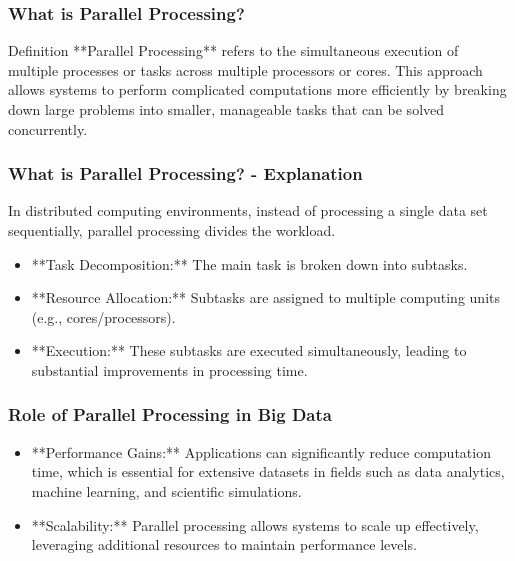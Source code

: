 \documentclass[aspectratio=169]{beamer}
\begin{document}
\begin{frame}[fragile]
    \frametitle{What is Parallel Processing?}
    \begin{block}{Definition}
        **Parallel Processing** refers to the simultaneous execution of multiple processes or tasks across multiple processors or cores.
        This approach allows systems to perform complicated computations more efficiently by breaking down large problems into smaller, manageable tasks that can be solved concurrently.
    \end{block}
\end{frame}

\begin{frame}[fragile]
    \frametitle{What is Parallel Processing? - Explanation}
    In distributed computing environments, instead of processing a single data set sequentially, parallel processing divides the workload.
    \begin{itemize}
        \item **Task Decomposition:** The main task is broken down into subtasks.
        \item **Resource Allocation:** Subtasks are assigned to multiple computing units (e.g., cores/processors).
        \item **Execution:** These subtasks are executed simultaneously, leading to substantial improvements in processing time.
    \end{itemize}
\end{frame}

\begin{frame}[fragile]
    \frametitle{Role of Parallel Processing in Big Data}
    \begin{itemize}
        \item **Performance Gains:** Applications can significantly reduce computation time, which is essential for extensive datasets in fields such as data analytics, machine learning, and scientific simulations.
        \item **Scalability:** Parallel processing allows systems to scale up effectively, leveraging additional resources to maintain performance levels.
    \end{itemize}
\end{frame}
\end{document}
